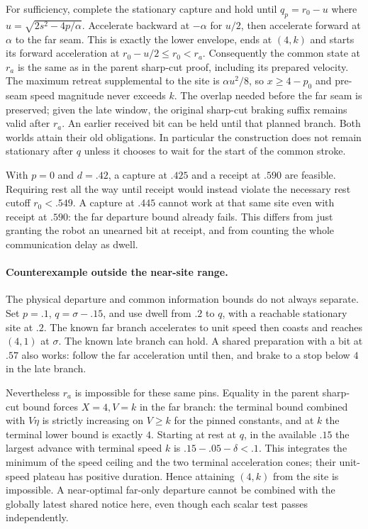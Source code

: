 \documentclass{article}
\begin{document}
For sufficiency, complete the stationary capture and hold until
$q_p=r_0-u$ where $u=\sqrt{2s^2-4p/\alpha}$. Accelerate backward at
$-\alpha$ for $u/2$, then accelerate forward at $\alpha$ to the far
seam. This is exactly the lower envelope, ends at $(4,k)$ and
starts its forward acceleration at $r_0-u/2\le r_0<r_a$.
Consequently the common state at $r_a$ is the same as in the
parent sharp-cut proof, including its prepared velocity. The
maximum retreat supplemental to the site is $\alpha u^2/8$,
so $x\ge4-p_0$ and pre-seam speed magnitude never exceeds $k$.
The overlap needed before the far seam is preserved; given the
late window, the original sharp-cut braking suffix remains
valid after $r_a$. An earlier received bit can be held until
that planned branch. Both worlds attain their old obligations.
In particular the construction does not remain stationary after
$q$ unless it chooses to wait for the start of the common stroke.

With $p=0$ and $d=.42$, a capture at $.425$ and a receipt at
$.590$ are feasible. Requiring rest all the way until receipt
would instead violate the necessary rest cutoff $r_0<.549$.
A capture at $.445$ cannot work at that same site even with
receipt at $.590$: the far departure bound already fails.
This differs from just granting the robot an unearned bit at
receipt, and from counting the whole communication delay as dwell.

\paragraph{Counterexample outside the near-site range.}
The physical departure and common information bounds do not
always separate. Set $p=.1$, $q=\sigma-.15$, and use dwell from $.2$
to $q$, with a reachable stationary site at $.2$. The known far
branch accelerates to unit speed then coasts and reaches $(4,1)$ at
$\sigma$. The known late branch can hold. A shared preparation
with a bit at $.57$ also works: follow the far acceleration until
then, and brake to a stop below $4$ in the late branch.

Nevertheless $r_a$ is impossible for these same pins. Equality
in the parent sharp-cut bound forces $X=4,V=k$ in the far
branch: the terminal bound combined with $V\eta$ is strictly
increasing on $V\ge k$ for the pinned constants, and at $k$ the
terminal lower bound is exactly $4$. Starting at rest at $q$,
in the available $.15$ the largest advance with terminal speed
$k$ is $.15-.05-\delta<.1$. This integrates the minimum of the
speed ceiling and the two terminal acceleration cones; their
unit-speed plateau has positive duration. Hence attaining $(4,k)$
from the site is impossible. A near-optimal far-only departure
cannot be combined with the globally latest shared notice here,
even though each scalar test passes independently.
\end{document}
